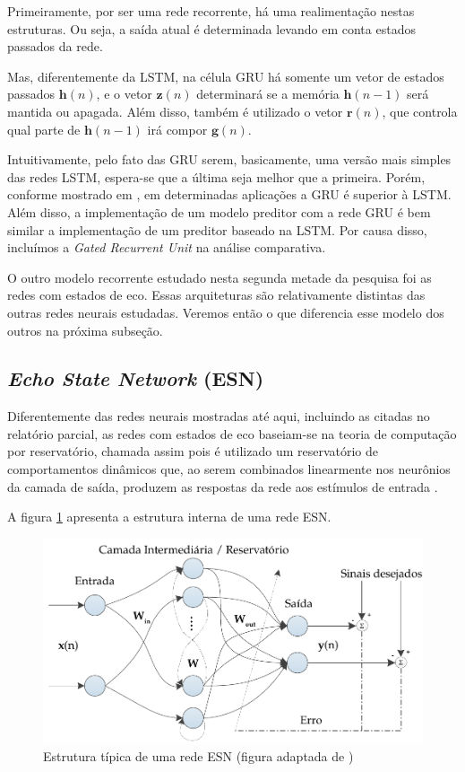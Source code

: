 \documentclass[a4paper, 12pt]{article}
\begin{document}
Primeiramente, por ser uma rede recorrente, há uma realimentação nestas estruturas. Ou seja, a saída atual é determinada levando em conta estados passados da rede.

Mas, diferentemente da LSTM, na célula GRU há somente um vetor de estados passados $\mathbf{h}(n)$, e o vetor $\mathbf{z}(n)$ determinará se a memória $\mathbf{h}(n-1)$ será mantida ou apagada. Além disso, também é utilizado o vetor $\mathbf{r}(n)$, que controla qual parte de $\mathbf{h}(n-1)$ irá compor $\mathbf{g}(n)$. 

Intuitivamente, pelo fato das GRU serem, basicamente, uma versão mais simples das redes LSTM, espera-se que a última seja melhor que a primeira. Porém, conforme mostrado em \cite{cho2014learning}, em determinadas aplicações a GRU é superior à LSTM. Além disso, a implementação de um modelo preditor com a rede GRU é bem similar a implementação de um preditor baseado na LSTM. Por causa disso, incluímos a \textit{Gated Recurrent Unit} na análise comparativa. 

O outro modelo recorrente estudado nesta segunda metade da pesquisa foi as redes com estados de eco. Essas arquiteturas são relativamente distintas das outras redes neurais estudadas. Veremos então o que diferencia esse modelo dos outros na próxima subseção.

\subsection{\textit{Echo State Network} (ESN)}

Diferentemente das redes neurais mostradas até aqui, incluindo as citadas no relatório parcial, as redes com estados de eco baseiam-se na teoria de computação por reservatório, chamada assim pois é utilizado um reservatório de comportamentos dinâmicos que, ao serem combinados linearmente nos neurônios da camada de saída, produzem as respostas da rede aos estímulos de entrada \cite{boccato2013novas}. 

A figura \ref{fig:esn-model} apresenta a estrutura interna de uma rede ESN.
\begin{figure}[H]
\centering
\includegraphics[scale = 0.8]{esn-network.pdf}
\caption{Estrutura típica de uma rede ESN (figura adaptada de \cite{boccato2013novas}) }
\label{fig:esn-model}
\end{figure}
\end{document}
